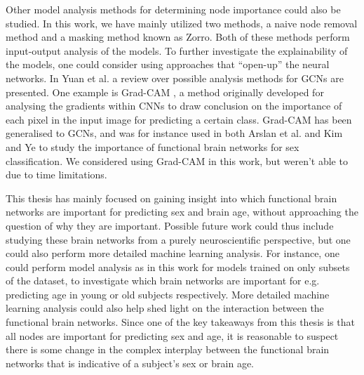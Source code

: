 
Other model analysis methods for determining node importance could also be studied. In this work, we have mainly utilized two methods, a naive node removal method and a masking method known as Zorro. Both of these methods perform input-output analysis of the models. To further investigate the explainability of the models, one could consider using approaches that ``open-up'' the neural networks. In Yuan et al. \cite{yuan_survey} a review over possible analysis methods for GCNs are presented. One example is Grad-CAM \cite{gradcam}, a method originally developed for analysing the gradients within CNNs to draw conclusion on the importance of each pixel in the input image for predicting a certain class. Grad-CAM has been generalised to GCNs, and was for instance used in both Arslan et al. \cite{arslan} and Kim and Ye \cite{understanding_gnn} to study the importance of functional brain networks for sex classification. We considered using Grad-CAM in this work, but weren't able to due to time limitations. 

This thesis has mainly focused on gaining insight into which functional brain networks are important for predicting sex and brain age, without approaching the question of why they are important. Possible future work could thus include studying these brain networks from a purely neuroscientific perspective, but one could also perform more detailed machine learning analysis. For instance, one could perform model analysis as in this work for models trained on only subsets of the dataset, to investigate which brain networks are important for e.g. predicting age in young or old subjects respectively. More detailed machine learning analysis could also help shed light on the interaction between the functional brain networks. Since one of the key takeaways from this thesis is that all nodes are important for predicting sex and age, it is reasonable to suspect there is some change in the complex interplay between the functional brain networks that is indicative of a subject's sex or brain age.
